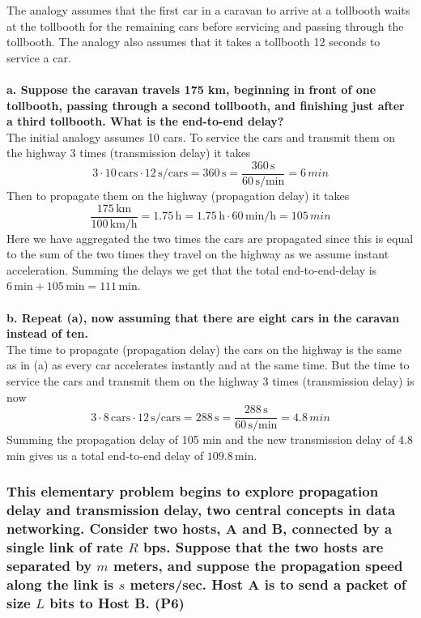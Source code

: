 The analogy assumes that the first car in a caravan to arrive at a tollbooth waits at the tollbooth for the remaining cars before servicing and passing through the tollbooth. The analogy also assumes that it takes a tollbooth 12 seconds to service a car. \\
\\
\textbf{a. Suppose the caravan travels 175 km, beginning in front of one tollbooth,
passing through a second tollbooth, and finishing just after a third tollbooth.
What is the end-to-end delay?} \\
The initial analogy assumes 10 cars. To service the cars and transmit them on the highway 3 times (transmission delay) it takes 
\begin{equation*}
    3 \cdot 10 \, \text{cars} \cdot 12 \, \text{s/cars} = 360 \, \text{s} = \frac{360 \, \text{s}}{60 \, \text{s/min}} =  6 \, min
\end{equation*}
Then to propagate them on the highway (propagation delay) it takes
\begin{equation*}
    \frac{175 \, \text{km}}{100 \, \text{km/h}} =  1.75 \, \text{h} = 1.75 \, \text{h} \cdot 60 \, \text{min/h} =  105 \, min
\end{equation*}
Here we have aggregated the two times the cars are propagated since this is equal to the sum of the two times they travel on the highway as we assume instant acceleration. Summing the delays we get that the total end-to-end-delay is $6 \, \text{min} + 105 \, \text{min} = 111 \, \text{min}$. \\
\\
\textbf{b. Repeat (a), now assuming that there are eight cars in the caravan instead
of ten.} \\
The time to propagate (propagation delay) the cars on the highway is the same as in (a) as every car accelerates instantly and at the same time. But the time to service the cars and transmit them on the highway 3 times (transmission delay) is now 
\begin{equation*}
    3 \cdot 8 \, \text{cars} \cdot 12 \, \text{s/cars} = 288 \, \text{s} = \frac{288 \, \text{s}}{60 \, \text{s/min}} =  4.8 \, min
\end{equation*}
Summing the propagation delay of 105 min and the new transmission delay of 4.8 min gives us a total end-to-end delay of $109.8 \, \text{min}$.

\subsubsection{This elementary problem begins to explore propagation delay and transmission delay, two central concepts in data networking. Consider two hosts, A and B, connected by a single link of rate $R$ bps. Suppose that the two hosts are separated by $m$ meters, and suppose the propagation speed along the link is $s$ meters/sec. Host A is to send a packet of size $L$ bits to Host B. (P6)}

